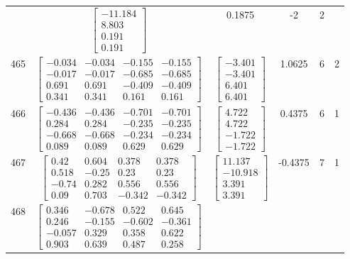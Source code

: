 \documentclass[a4paper,12pt]{article}
\begin{document}
\begin{tabular}{c c c c c c}
&
$\begin{bmatrix} -11.184 \\ 8.803 \\ 0.191 \\ 0.191 \end{bmatrix}$
&
0.1875
&
-2
&
2
\\
465
&
$\begin{bmatrix} -0.034 & -0.034 & -0.155 & -0.155 \\ -0.017 & -0.017 & -0.685 & -0.685 \\ 0.691 & 0.691 & -0.409 & -0.409 \\ 0.341 & 0.341 & 0.161 & 0.161 \end{bmatrix}$
&
$\begin{bmatrix} -3.401 \\ -3.401 \\ 6.401 \\ 6.401 \end{bmatrix}$
&
1.0625
&
6
&
2
\\
466
&
$\begin{bmatrix} -0.436 & -0.436 & -0.701 & -0.701 \\ 0.284 & 0.284 & -0.235 & -0.235 \\ -0.668 & -0.668 & -0.234 & -0.234 \\ 0.089 & 0.089 & 0.629 & 0.629 \end{bmatrix}$
&
$\begin{bmatrix} 4.722 \\ 4.722 \\ -1.722 \\ -1.722 \end{bmatrix}$
&
0.4375
&
6
&
1
\\
467
&
$\begin{bmatrix} 0.42 & 0.604 & 0.378 & 0.378 \\ 0.518 & -0.25 & 0.23 & 0.23 \\ -0.74 & 0.282 & 0.556 & 0.556 \\ 0.09 & 0.703 & -0.342 & -0.342 \end{bmatrix}$
&
$\begin{bmatrix} 11.137 \\ -10.918 \\ 3.391 \\ 3.391 \end{bmatrix}$
&
-0.4375
&
7
&
1
\\
468
&
$\begin{bmatrix} 0.346 & -0.678 & 0.522 & 0.645 \\ 0.246 & -0.155 & -0.602 & -0.361 \\ -0.057 & 0.329 & 0.358 & 0.622 \\ 0.903 & 0.639 & 0.487 & 0.258 \end{bmatrix}$

\end{tabular}
\end{document}
